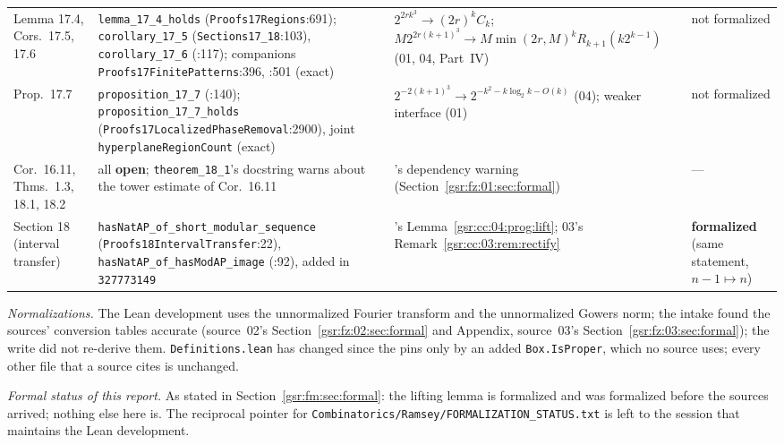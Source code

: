 \documentclass[11pt,letterpaper]{article}
\numberwithin{equation}{section}
\theoremstyle{definition}
\theoremstyle{remark}
\newcommand{\1}{\mathbf 1}
\newcommand{\file}[1]{\nolinkurl{#1}}
\begin{document}
\begin{longtable}{@{}>{\raggedright\arraybackslash}p{} >{\raggedright\arraybackslash}p{} >{\raggedright\arraybackslash}p{} >{\raggedright\arraybackslash}p{}@{}}
Lemma 17.4, Cors.~17.5, 17.6 & \file{lemma_17_4_holds} (\file{Proofs17Regions}:691); \file{corollary_17_5} (\file{Sections17\_18}:103), \file{corollary_17_6} (:117); companions \file{Proofs17FinitePatterns}:396, :501 (exact) & $2^{2rk^3}\to(2r)^kC_k$; $M2^{2r(k+1)^3}\to M\min(2r,M)^kR_{k+1}(k2^{k-1})$ (01, 04, Part~IV) & not formalized\\
Prop.~17.7 & \file{proposition_17_7} (:140); \file{proposition_17_7_holds} (\file{Proofs17LocalizedPhaseRemoval}:2900), joint \texttt{hyperplaneRegionCount} (exact) & $2^{-2(k+1)^3}\to2^{-k^2-k\log_2k-O(k)}$ (04); weaker interface (01) & not formalized\\
Cor.~16.11, Thms.~1.3, 18.1, 18.2 & all \textbf{open}; \file{theorem_18_1}'s docstring warns about the tower estimate of Cor.~16.11 & 01's dependency warning (Section~\ref{gsr:fz:01:sec:formal}) & ---\\
Section 18 (interval transfer) & \file{hasNatAP_of_short_modular_sequence} (\file{Proofs18IntervalTransfer}:22), \file{hasNatAP_of_hasModAP_image} (:92), added in \texttt{327773149} & 04's Lemma~\ref{gsr:cc:04:prog:lift}; 03's Remark~\ref{gsr:cc:03:rem:rectify} & \textbf{formalized} (same statement, $n-1\mapsto n$)\\
\bottomrule
\end{longtable}
\endgroup

\emph{Normalizations.} The Lean development uses the unnormalized Fourier transform and the unnormalized Gowers norm; the intake found the sources' conversion tables accurate (source~02's Section~\ref{gsr:fz:02:sec:formal} and Appendix, source~03's Section~\ref{gsr:fz:03:sec:formal}); the write did not re-derive them. \file{Definitions.lean} has changed since the pins only by an added \texttt{Box.IsProper}, which no source uses; every other file that a source cites is unchanged.

\emph{Formal status of this report.} As stated in Section~\ref{gsr:fm:sec:formal}: the lifting lemma is formalized and was formalized before the sources arrived; nothing else here is. The reciprocal pointer for \file{Combinatorics/Ramsey/FORMALIZATION\_STATUS.txt} is left to the session that maintains the Lean development.
\end{document}
